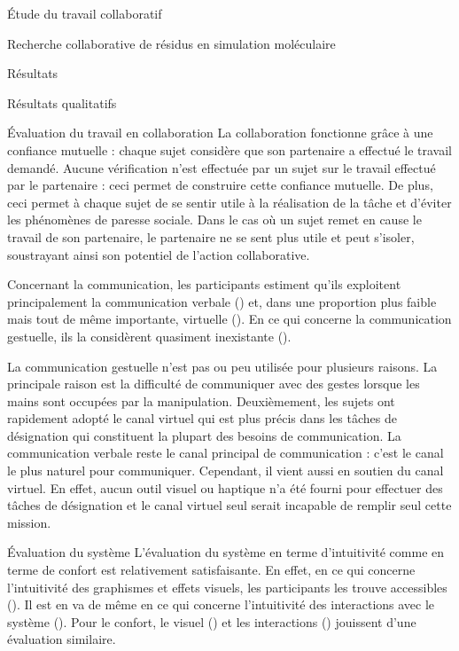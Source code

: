 \documentclass[myfrancais]{mythesis}
\begin{document}
\begin{mypart}{Étude du travail collaboratif}
\begin{mychapter}{Recherche collaborative de résidus en simulation moléculaire}
\begin{mysection}{Résultats}
\begin{mysubsection}{Résultats qualitatifs}
\begin{mysubsubsection}{Évaluation du travail en collaboration}
						La collaboration fonctionne grâce à une confiance mutuelle : chaque sujet considère que son partenaire a effectué le travail demandé.
						Aucune vérification n'est effectuée par un sujet sur le travail effectué par le partenaire : ceci permet de construire cette confiance mutuelle.
						De plus, ceci permet à chaque sujet de se sentir utile à la réalisation de la tâche et d'éviter les phénomènes de paresse sociale.
						Dans le cas où un sujet remet en cause le travail de son partenaire, le partenaire ne se sent plus utile et peut s'isoler, soustrayant ainsi son potentiel de l'action collaborative.

						Concernant la communication, les participants estiment qu'ils exploitent principalement la communication verbale () et, dans une proportion plus faible mais tout de même importante, virtuelle ().
						En ce qui concerne la communication gestuelle, ils la considèrent quasiment inexistante ().

						La communication gestuelle n'est pas ou peu utilisée pour plusieurs raisons.
						La principale raison est la difficulté de communiquer avec des gestes lorsque les mains sont occupées par la manipulation.
						Deuxièmement, les sujets ont rapidement adopté le canal virtuel qui est plus précis dans les tâches de désignation qui constituent la plupart des besoins de communication.
						La communication verbale reste le canal principal de communication : c'est le canal le plus naturel pour communiquer.
						Cependant, il vient aussi en soutien du canal virtuel.
						En effet, aucun outil visuel ou haptique n'a été fourni pour effectuer des tâches de désignation et le canal virtuel seul serait incapable de remplir seul cette mission.
					\end{mysubsubsection}
					\begin{mysubsubsection}{Évaluation du système}
						L'évaluation du système en terme d'intuitivité comme en terme de confort est relativement satisfaisante.
						En effet, en ce qui concerne l'intuitivité des graphismes et effets visuels, les participants les trouve accessibles ().
						Il est en va de même en ce qui concerne l'intuitivité des interactions avec le système ().
						Pour le confort, le visuel () et les interactions () jouissent d'une évaluation similaire.


\end{mysubsubsection}
\end{mysubsection}
\end{mysection}
\end{mychapter}
\end{mypart}
\end{document}
